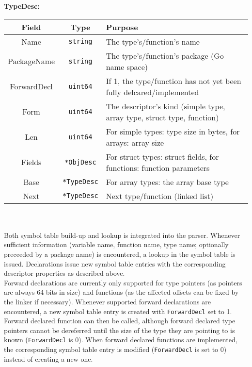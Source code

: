 \documentclass[a4paper]{scrreprt}
\begin{document}
      \textbf{TypeDesc:}\\
      \begin{tabular}{|c|c|l|}
        \hline
        \textbf{Field} & \textbf{Type} & \textbf{Purpose}\\ \hline
        Name & \texttt{string} & The type's/function's name\\ \hline
        PackageName & \texttt{string} & The type's/function's package (Go name space)\\ \hline
        ForwardDecl & \texttt{uint64} & If 1, the type/function has not yet been fully delcared/implemented\\ \hline
        Form & \texttt{uint64} & The descriptor's kind (simple type, array type, struct type, function)\\ \hline
        Len & \texttt{uint64} & For simple types: type size in bytes, for arrays: array size\\ \hline
        Fields & \texttt{*ObjDesc} & For struct types: struct fields, for functions: function parameters\\ \hline
        Base & \texttt{*TypeDesc} & For array types: the array base type\\ \hline
        Next & \texttt{*TypeDesc} & Next type/function (linked list)\\ \hline
      \end{tabular}\\ \\
    Both symbol table build-up and lookup is integrated into the parser. Whenever sufficient information (variable name, function name, type name; optionally preceeded by a package name) is encountered, a lookup in the symbol table is issued. Declarations issue new symbol table entries with the corresponding descriptor properties as described above.\\
    Forward declarations are currently only supported for type pointers (as pointers are always 64 bits in size) and functions (as the affected offsets can be fixed by the linker if necessary). Whenever supported forward declarations are encountered, a new symbol table entry is created with \texttt{ForwardDecl} set to 1. Forward declared function can then be called, although forward declared type pointers cannot be dereferred until the size of the type they are pointing to is known (\texttt{ForwardDecl} is 0). When forward declared functions are implemented, the corresponding symbol table entry is modified (\texttt{ForwardDecl} is set to 0) instead of creating a new one.
      
\end{document}
